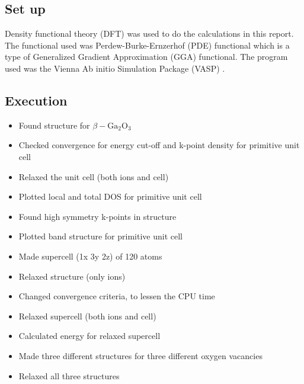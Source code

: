 \subsection{Set up}

Density functional theory (DFT) was used to do the calculations in this report. The functional used was Perdew-Burke-Ernzerhof (PDE) functional which is a type of Generalized Gradient Approximation (GGA) functional. The program used was the Vienna Ab initio Simulation Package (VASP) \cite{vasp1,vasp2,vasp3,vasp4}.


\subsection{Execution}

\begin{itemize}

\item Found structure for $\beta- \text{Ga}_2\text{O}_3$

\item Checked convergence for energy cut-off and k-point density for primitive unit cell

\item Relaxed the unit cell (both ions and cell)

\item Plotted local and total DOS for primitive unit cell

\item Found high symmetry k-points in structure

\item Plotted band structure for primitive unit cell

\item Made supercell (1x 3y 2z) of 120 atoms

\item Relaxed structure (only ions)

\item Changed convergence criteria, to lessen the CPU time

\item Relaxed supercell (both ions and cell)

\item Calculated energy for relaxed supercell

\item Made three different structures for three different oxygen vacancies

\item Relaxed all three structures


\end{itemize}
